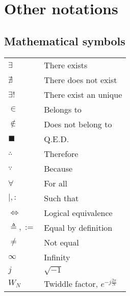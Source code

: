 \documentclass{article}
\begin{document}
\section{Other notations}
\subsection{Mathematical symbols}
\begin{xltabular}{\textwidth}{XX}
    \(\exists\) & There exists\\
    \(\nexists\) & There does not exist\\
    \(\exists!\) & There exist an unique\\
    \(\in\) & Belongs to\\
    \(\not\in\) & Does not belong to\\
    \(\blacksquare\) & Q.E.D. \\
    \(\therefore\) & Therefore\\
    \(\because\) & Because\\
    \(\forall\) & For all\\
    \(\mid, :\) & Such that\\
    \(\iff\) & Logical equivalence\\
    \(\triangleq, :=\) & Equal by definition\\
    \(\neq\) & Not equal\\
    \(\infty\) & Infinity\\
    \(j\) & \(\sqrt{-1}\)\\
    \(W_N\) & Twiddle factor, \(e^{-j\frac{2\pi}{N}}\)
\end{xltabular}
\end{document}
